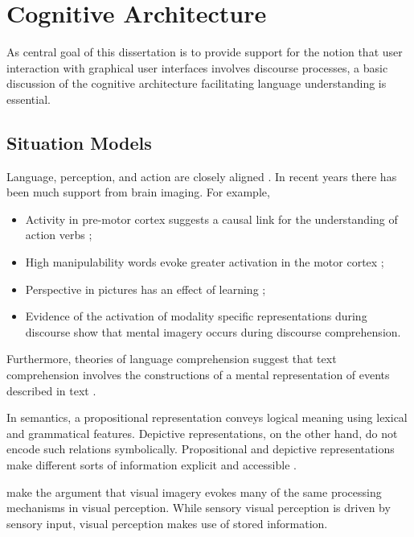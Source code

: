 \section{Cognitive Architecture}
\label{cognitivearchitecture}

As central goal of this dissertation is to provide support for the notion that user interaction with graphical user interfaces involves discourse processes, a basic discussion of the cognitive architecture facilitating language understanding is essential.

\subsection{Situation Models}
\label{situationmodels}

Language, perception, and action are closely aligned  \citep{Lakoff:2008tq}.  In recent years there has been much support from brain imaging. For example,

\begin{itemize}
\item Activity in pre-motor cortex suggests a causal link for the understanding of action verbs \citep{Willems:2011gp};
\item High manipulability words evoke greater activation in the motor cortex \citep{Madan:2012ja};
\item Perspective in pictures has an effect of learning \citep{deNooijer:2013jc};
\item Evidence of the activation of modality specific representations during discourse show that mental imagery occurs during discourse comprehension.\citep{Kurby:2013tp}
\end{itemize}

Furthermore, theories of language comprehension suggest that text comprehension involves the constructions of a mental representation of events described in text  \citep{Zwaan:2002va,Kintsch:1978vz,vanDijk:1990tc}.  

In semantics, a propositional representation conveys logical meaning using lexical and grammatical features. Depictive representations, on the other hand, do not encode such relations symbolically. Propositional and depictive representations make different sorts of information explicit and accessible  \citep{Kosslyn:2006tj}. 

 \citet{Kosslyn:2006tj}  make the argument that visual imagery evokes many of the same processing mechanisms in visual perception. While sensory visual perception is driven by sensory input, visual perception makes use of stored information.

